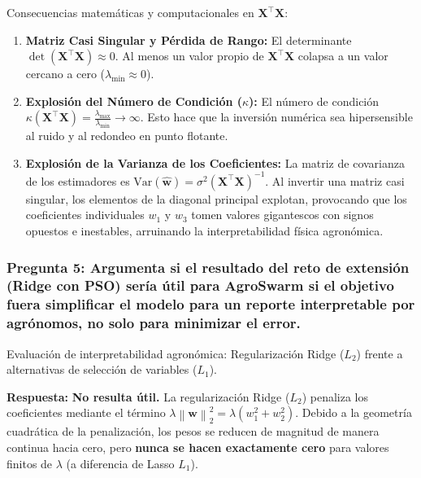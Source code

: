 \documentclass[12pt,a4paper]{article}
\newcommand{\norm}[1]{\left\lVert #1\right\rVert}
\begin{document}
Consecuencias matemáticas y computacionales en $\mathbf{X}^\top \mathbf{X}$:
\begin{enumerate}[label={\color{p3blue}$\blacktriangleright$}]
  \item \textbf{Matriz Casi Singular y Pérdida de Rango:} El determinante $\det(\mathbf{X}^\top \mathbf{X}) \approx 0$. Al menos un valor propio de $\mathbf{X}^\top \mathbf{X}$ colapsa a un valor cercano a cero ($\lambda_{\min} \approx 0$).
  \item \textbf{Explosión del Número de Condición ($\kappa$):} El número de condición $\kappa(\mathbf{X}^\top \mathbf{X}) = \frac{\lambda_{\max}}{\lambda_{\min}} \to \infty$. Esto hace que la inversión numérica sea hipersensible al ruido y al redondeo en punto flotante.
  \item \textbf{Explosión de la Varianza de los Coeficientes:} La matriz de covarianza de los estimadores es $\text{Var}(\hat{\mathbf{w}}) = \sigma^2 (\mathbf{X}^\top \mathbf{X})^{-1}$. Al invertir una matriz casi singular, los elementos de la diagonal principal explotan, provocando que los coeficientes individuales $w_1$ y $w_3$ tomen valores gigantescos con signos opuestos e inestables, arruinando la interpretabilidad física agronómica.
\end{enumerate}

\vspace{10pt}
\subsubsection*{Pregunta 5: Argumenta si el resultado del reto de extensión (Ridge con PSO) sería útil para AgroSwarm si el objetivo fuera simplificar el modelo para un reporte interpretable por agrónomos, no solo para minimizar el error.}
\begin{pthreeProblem}
Evaluación de interpretabilidad agronómica: Regularización Ridge ($L_2$) frente a alternativas de selección de variables ($L_1$).
\end{pthreeProblem}

\textbf{Respuesta:}
\textbf{No resulta útil.} La regularización Ridge ($L_2$) penaliza los coeficientes mediante el término $\lambda \norm{\mathbf{w}}_2^2 = \lambda (w_1^2 + w_2^2)$. Debido a la geometría cuadrática de la penalización, los pesos se reducen de magnitud de manera continua hacia cero, pero \textbf{nunca se hacen exactamente cero} para valores finitos de $\lambda$ (a diferencia de Lasso $L_1$).
\end{document}
